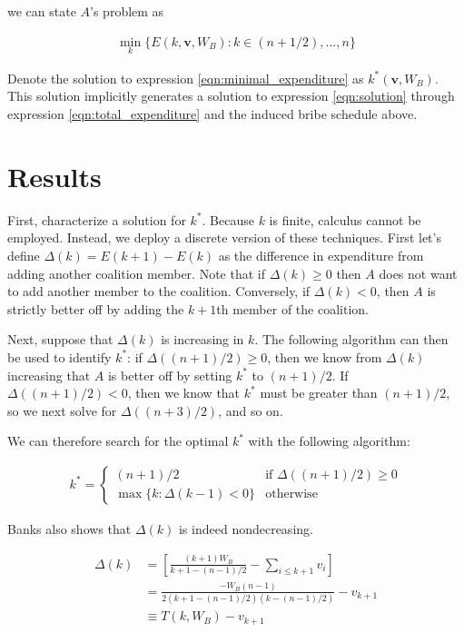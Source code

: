 \documentclass[12pt,a4paper]{article}
\begin{document}
we can state $A$'s problem as

\begin{align}
\label{eqn:minimal_expenditure}
\min_k \{E(k, \mathbf{v}, W_B) : k \in {(n + 1/2), ..., n}\}
\end{align}

Denote the solution to expression \ref{eqn:minimal_expenditure} as $k^*(\mathbf{v}, W_B)$. This solution implicitly generates a solution to expression \ref{eqn:solution} through expression \ref{eqn:total_expenditure} and the induced bribe schedule above. 

\section{Results}

First, characterize a solution for $k^*$. Because $k$ is finite, calculus cannot be employed. Instead, we deploy a discrete version of these techniques. First let's define $\Delta(k) = E(k + 1) - E(k)$ as the difference in expenditure from adding another coalition member. Note that if $\Delta(k) \geq 0$ then $A$ does not want to add another member to the coalition. Conversely, if $\Delta(k) < 0$, then $A$ is strictly better off by adding the $k + 1$th member of the coalition.

Next, suppose that $\Delta(k)$ is increasing in $k$. The following algorithm can then be used to identify $k^*$: if $\Delta((n + 1)/2) \geq 0$, then we know from $\Delta(k)$ increasing that $A$ is better off by setting $k^*$ to $(n + 1)/2$. If $\Delta((n + 1)/2) < 0$, then we know that $k^*$ must be greater than $(n + 1)/2$, so we next solve for $\Delta((n + 3)/2)$, and so on.

We can therefore search for the optimal $k^*$ with the following algorithm:

\begin{align}
    \label{eqn:optimal_k}
    k^* = 
    \begin{cases}
        (n + 1)/2 & \text{if } \Delta((n + 1)/2) \geq 0 \\
        \max\{k : \Delta(k - 1) < 0\} & \text{otherwise}
    \end{cases}
\end{align}

Banks also shows that $\Delta(k)$ is indeed nondecreasing.

\begin{align}
    \Delta(k)  & = \left[\frac{(k + 1)W_B}{k + 1 - (n - 1)/2} - \sum_{i \leq k + 1}v_i \right]\\
    \label{eqn:deltAk}
    & = \frac{-W_B (n - 1)}{2(k + 1 - (n - 1)/2)(k - (n - 1)/2)} - v_{k + 1}\\
    \label{eqn:def_deltAk}
    & \equiv T(k, W_B) - v_{k + 1}
\end{align}
\end{document}
